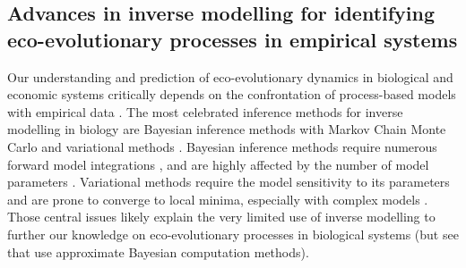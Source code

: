 \subsection{Advances in inverse modelling for identifying eco-evolutionary processes in empirical systems}

Our understanding and prediction of eco-evolutionary dynamics in biological and economic systems critically depends on the confrontation of process-based models with empirical data \citep{Pelletier2009,Hidalgo2021}.
% 
% 
The most celebrated inference methods for inverse modelling in biology are Bayesian inference methods with Markov Chain Monte Carlo \citep{Lignell2013,Higgins2010,Xu2006,Fiechter2013,Rosenbaum2019} and variational methods \citep{Schartau2017}.
% 
% 
Bayesian inference methods require numerous forward model integrations \citep{Schneider2017}, and are highly affected by the number of model parameters \citep{Csillery2010}.
% 
Variational methods require the model sensitivity to its parameters \citep{Schartau2017} and are prone to converge to local minima, especially with complex models \citep{Gabor2015}.
% 
Those central issues likely explain the very limited use of inverse modelling to further our knowledge on eco-evolutionary processes in biological systems (but see \cite{Sukumaran2016,Skeels2019,Skeels2022} that use approximate Bayesian computation methods). 

